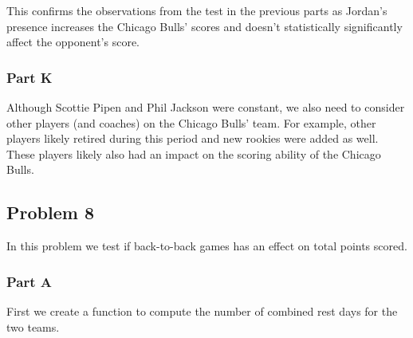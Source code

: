 \documentclass[11pt]{article}
\begin{document}
This confirms the observations from the test in the previous parts as
Jordan's presence increases the Chicago Bulls' scores and doesn't
statistically significantly affect the opponent's score.

    \subsubsection*{Part K}\label{part-k}

Although Scottie Pipen and Phil Jackson were constant, we also need to
consider other players (and coaches) on the Chicago Bulls' team. For
example, other players likely retired during this period and new rookies
were added as well. These players likely also had an impact on the
scoring ability of the Chicago Bulls.

    \subsection*{Problem 8}\label{problem-8}

In this problem we test if back-to-back games has an effect on total
points scored.

\subsubsection*{Part A}\label{part-a}

First we create a function to compute the number of combined rest days
for the two teams.
\end{document}
